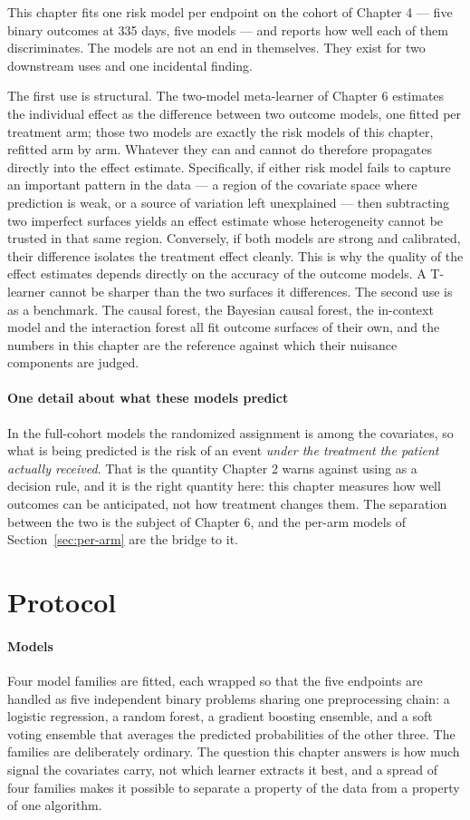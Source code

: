 This chapter fits one risk model per endpoint on the cohort of Chapter 4 —
five binary outcomes at 335 days, five models — and reports how well each of
them discriminates. The models are not an end in themselves. They exist for
two downstream uses and one incidental finding.

The first use is structural. The two-model meta-learner of Chapter 6 estimates
the individual effect as the difference between two outcome models, one fitted
per treatment arm; those two models are exactly the risk models of this
chapter, refitted arm by arm. Whatever they can and cannot do therefore
propagates directly into the effect estimate. Specifically, if either risk model
fails to capture an important pattern in the data — a region of the covariate
space where prediction is weak, or a source of variation left unexplained —
then subtracting two imperfect surfaces yields an effect estimate whose
heterogeneity cannot be trusted in that same region. Conversely, if both models
are strong and calibrated, their difference isolates the treatment effect
cleanly. This is why the quality of the effect estimates depends directly on
the accuracy of the outcome models. A T-learner cannot be sharper than the
two surfaces it differences. The second use is as a benchmark. The
causal forest, the Bayesian causal forest, the in-context model and the
interaction forest all fit outcome surfaces of their own, and the numbers in
this chapter are the reference against which their nuisance components are
judged.

\paragraph{One detail about what these models predict}
In the full-cohort models the randomized assignment is among the covariates,
so what is being predicted is the risk of an event \emph{under the treatment
the patient actually received}. That is the quantity Chapter 2 warns against
using as a decision rule, and it is the right quantity here: this chapter
measures how well outcomes can be anticipated, not how treatment changes them.
The separation between the two is the subject of Chapter 6, and the per-arm
models of Section~\ref{sec:per-arm} are the bridge to it.

\section{Protocol}

\paragraph{Models}
Four model families are fitted, each wrapped so that the five endpoints are
handled as five independent binary problems sharing one preprocessing chain: a
logistic regression, a random forest, a gradient boosting ensemble, and a soft
voting ensemble that averages the predicted probabilities of the other three.
The families are deliberately ordinary. The question this chapter answers is
how much signal the covariates carry, not which learner extracts it best, and
a spread of four families makes it possible to separate a property of the data
from a property of one algorithm.

